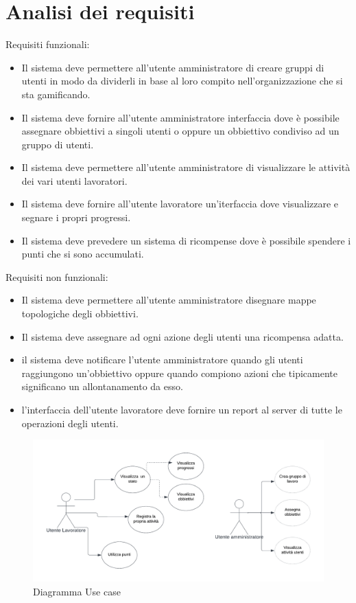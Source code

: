 \section{Analisi dei requisiti}

Requisiti funzionali:
\begin{itemize}

  \item Il sistema deve permettere all'utente amministratore di creare gruppi di utenti in modo da dividerli in base al loro compito nell'organizzazione che si sta gamificando.

  \item Il sistema deve fornire all'utente amministratore interfaccia dove è possibile assegnare obbiettivi a singoli utenti o oppure un obbiettivo condiviso ad un gruppo di utenti.

  \item Il sistema deve permettere all'utente amministratore di visualizzare le attività dei vari utenti lavoratori.

  \item Il sistema deve fornire all'utente lavoratore un'iterfaccia dove visualizzare e segnare i propri progressi.

  \item Il sistema deve prevedere un sistema di ricompense dove è possibile spendere i punti che si sono accumulati.
\end{itemize}

Requisiti non funzionali:
\begin{itemize}

  \item Il sistema deve permettere all'utente amministratore disegnare mappe topologiche degli obbiettivi.

  \item Il sistema deve assegnare ad ogni azione degli utenti una ricompensa adatta.

  \item il sistema deve notificare l'utente amministratore quando gli utenti raggiungono un'obbiettivo oppure quando compiono azioni che tipicamente significano un allontanamento da esso.

  \item l'interfaccia dell'utente lavoratore deve fornire un report al server di tutte le operazioni degli utenti.
\end{itemize}

\begin{figure}[h!]
  \centerline{\includegraphics[angle=0]{figures/utenti.pdf}}
  \caption{Diagramma Use case}
\end{figure}

